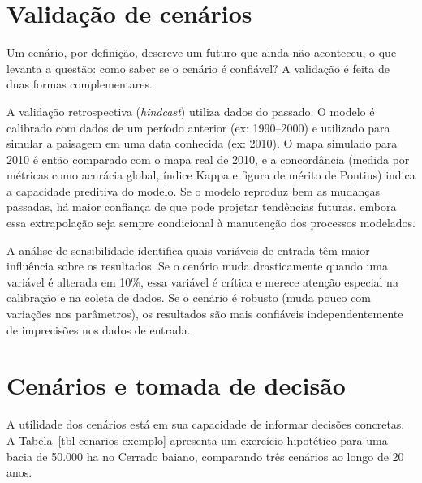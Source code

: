\documentclass[
  portuguese,
  11pt,
  a4paper,
  open=any]{scrbook}
\begin{document}
\section{Validação de cenários}\label{validauxe7uxe3o-de-cenuxe1rios}

Um cenário, por definição, descreve um futuro que ainda não aconteceu, o
que levanta a questão: como saber se o cenário é confiável? A validação
é feita de duas formas complementares.

A validação retrospectiva (\emph{hindcast}) utiliza dados do passado. O
modelo é calibrado com dados de um período anterior (ex: 1990--2000) e
utilizado para simular a paisagem em uma data conhecida (ex: 2010). O
mapa simulado para 2010 é então comparado com o mapa real de 2010, e a
concordância (medida por métricas como acurácia global, índice Kappa e
figura de mérito de Pontius) indica a capacidade preditiva do modelo. Se
o modelo reproduz bem as mudanças passadas, há maior confiança de que
pode projetar tendências futuras, embora essa extrapolação seja sempre
condicional à manutenção dos processos modelados.

A análise de sensibilidade identifica quais variáveis de entrada têm
maior influência sobre os resultados. Se o cenário muda drasticamente
quando uma variável é alterada em 10\%, essa variável é crítica e merece
atenção especial na calibração e na coleta de dados. Se o cenário é
robusto (muda pouco com variações nos parâmetros), os resultados são
mais confiáveis independentemente de imprecisões nos dados de entrada.

\section{Cenários e tomada de
decisão}\label{cenuxe1rios-e-tomada-de-decisuxe3o}

A utilidade dos cenários está em sua capacidade de informar decisões
concretas. A Tabela~\ref{tbl-cenarios-exemplo} apresenta um exercício
hipotético para uma bacia de 50.000 ha no Cerrado baiano, comparando
três cenários ao longo de 20 anos.
\end{document}
